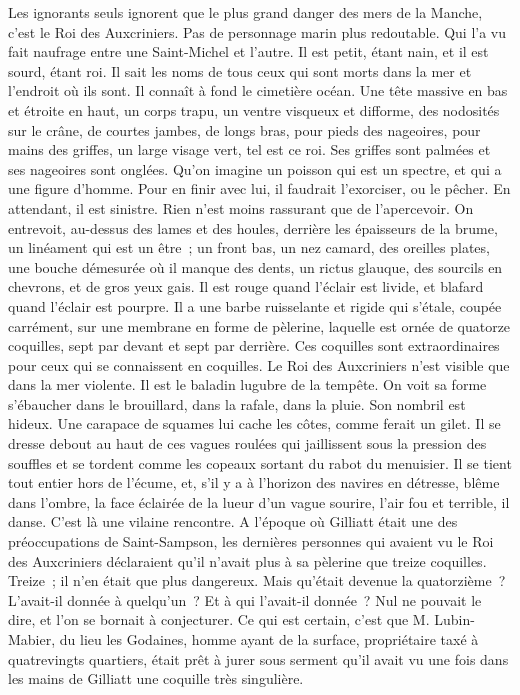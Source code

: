 \documentclass[french,twoside]{book} %
\begin{document}
Les ignorants seuls ignorent que le plus grand danger des mers de la Manche, c’est le Roi des Auxcriniers. Pas de personnage marin plus redoutable. Qui l’a vu fait naufrage entre une Saint-Michel et l’autre. Il est petit, étant nain, et il est sourd, étant roi. Il  sait les noms de tous ceux qui sont morts dans la mer et l’endroit où ils sont. Il connaît à fond le cimetière océan. Une tête massive en bas et étroite en haut, un corps trapu, un ventre visqueux et difforme, des nodosités sur le crâne, de courtes jambes, de longs bras, pour pieds des nageoires, pour mains des griffes, un large visage vert, tel est ce roi. Ses griffes sont palmées et ses nageoires sont onglées. Qu’on imagine un poisson qui est un spectre, et qui a une figure d’homme. Pour en finir avec lui, il faudrait l’exorciser, ou le pêcher. En attendant, il est sinistre. Rien n’est moins rassurant que de l’apercevoir. On entrevoit, au-dessus des lames et des houles, derrière les épaisseurs de la brume, un linéament qui est un être ; un front bas, un nez camard, des oreilles plates, une bouche démesurée où il manque des dents, un rictus glauque, des sourcils en chevrons, et de gros yeux gais. Il est rouge quand l’éclair est livide, et blafard quand l’éclair est pourpre. Il a une barbe ruisselante et rigide qui s’étale, coupée carrément, sur une membrane en forme de pèlerine, laquelle est ornée de quatorze coquilles, sept par devant et sept par derrière. Ces coquilles sont extraordinaires pour ceux qui se connaissent en coquilles. Le Roi des Auxcriniers n’est visible que dans la mer violente. Il est le baladin lugubre de la tempête. On voit sa forme s’ébaucher dans le brouillard, dans la rafale, dans la pluie. Son nombril est hideux. Une carapace de squames lui cache les côtes, comme ferait un gilet. Il se dresse debout au haut de ces vagues roulées qui jaillissent sous la pression des souffles et  se tordent comme les copeaux sortant du rabot du menuisier. Il se tient tout entier hors de l’écume, et, s’il y a à l’horizon des navires en détresse, blême dans l’ombre, la face éclairée de la lueur d’un vague sourire, l’air fou et terrible, il danse. C’est là une vilaine rencontre. A l’époque où Gilliatt était une des préoccupations de Saint-Sampson, les dernières personnes qui avaient vu le Roi des Auxcriniers déclaraient qu’il n’avait plus à sa pèlerine que treize coquilles. Treize ; il n’en était que plus dangereux. Mais qu’était devenue la quatorzième ? L’avait-il donnée à quelqu’un ? Et à qui l’avait-il donnée ? Nul ne pouvait le dire, et l’on se bornait à conjecturer. Ce qui est certain, c’est que M. Lubin-Mabier, du lieu les Godaines, homme ayant de la surface, propriétaire taxé à quatrevingts quartiers, était prêt à jurer sous serment qu’il avait vu une fois dans les mains de Gilliatt une coquille très singulière.\par
\end{document}
